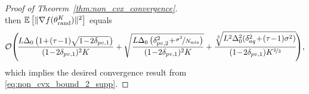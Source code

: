 \begin{proof}[Proof of Theorem~\ref{thm:non_cvx_convergence}]
\begin{equation*}
    \end{equation*}
    then $\mathbb{E}\left[\|\nabla f(\theta_{\text{rand}}^K)\|^2\right]$ equals
    \begin{equation*}
        \cO\!\left(\!\frac{L\Delta_0\left(1\!+\! (\tau\!-\!1)\sqrt{1\!-\!2\delta_{pv,1}}\right)}{(1\!-\!2\delta_{pv,1})^2K} + \sqrt{\frac{L\Delta_0\left(\delta_{pv,2}^2\! +\! \nicefrac{\sigma^2}{N_{\min}}\right)}{(1\!-\!2\delta_{pv,1})^2K}} + \frac{\sqrt[3]{L^2\Delta_0^2(\delta_{aq}^2\! +\! (\tau\!-\!1)\sigma^2)}}{(1\!-\!2\delta_{pv,1})K^{\nicefrac{2}{3}}}\!\right)\!,
    \end{equation*}
    which implies the desired convergence result from \eqref{eq:non_cvx_bound_2_supp}.
\end{proof}